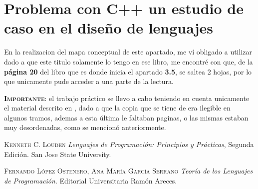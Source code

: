 \documentclass{article}
\begin{document}
\section*{Problema con C++ un estudio de caso en el dise\~{n}o de lenguajes}
\label{prob1}
En la realizacion del mapa conceptual de este apartado, me v\'i obligado a utilizar \cite{comppth} dado a que este titulo solamente lo tengo en ese libro, me encontr\'e con que, de la \textbf{p\'agina 20} del libro que es donde inicia el apartado \textbf{3.5}, se saltea 2 hojas, por lo que unicamente pude acceder a una parte de la lectura.
\newline
\newline
\newline

\textbf{\textsc{Importante}}: el trabajo pr\'actico se llevo a cabo teniendo en cuenta unicamente el material descrito en \cite{teolengprog} , dado a que la copia que se tiene de \cite{comppth} era ilegible en algunos tramos, ademas a esta \'ultima le faltaban paginas, o las mismas estaban muy desordenadas, como se mencion\'o anteriormente.



\newpage
\begin{thebibliography}{9}
	\textsc{Kenneth C. Louden}
	\textit{Lenguajes de Programaci\'on: Principios y Pr\'acticas}, Segunda Edici\'on.
	San Jose State University.

	\textsc{Fernando L\'opez Ostenero, Ana Mar\'ia Garc\'ia Serrano}
	\textit{Teor\'ia de los Lenguajes de Programaci\'on}. 
	Editorial Universitaria Ram\'on Areces.
\end{thebibliography}
\end{document}
